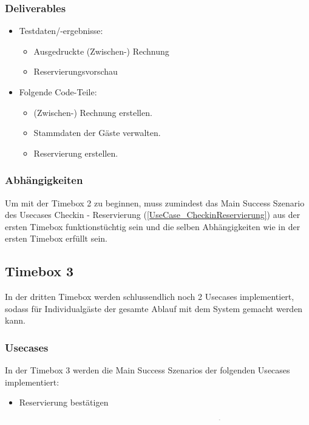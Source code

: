 \subsubsection{Deliverables}
\begin{itemize}
	\item Testdaten/-ergebnisse:
	\begin{itemize}
		\item Ausgedruckte (Zwischen-) \Gls{Rechnung}
		\item \Gls{Reservierung}svorschau
	\end{itemize}

	\item Folgende Code-Teile:
	\begin{itemize}
		\item (Zwischen-) \Gls{Rechnung} erstellen.
		\item \Gls{Stammdaten} der Gäste verwalten.
		\item \Gls{Reservierung} erstellen.
	\end{itemize}
\end{itemize}

\subsubsection{Abhängigkeiten}
Um mit der Timebox 2 zu beginnen, muss zumindest das Main Success Szenario des Usecases Checkin - Reservierung (\ref{UseCase_CheckinReservierung}) aus der ersten Timebox funktionstüchtig sein
und die selben Abhängigkeiten wie in der ersten Timebox erfüllt sein.


\subsection{Timebox 3}
In der dritten Timebox werden schlussendlich noch 2 Usecases implementiert, sodass für Individualgäste der gesamte Ablauf mit dem System gemacht werden kann.

\subsubsection{Usecases}
In der Timebox 3 werden die Main Success Szenarios der folgenden Usecases implementiert:

\begin{itemize}
	\item \Gls{Reservierung} bestätigen
	\item \Gls{Reservierung} Stornieren - Individualperson inklusive folgender Extensions:
	\begin{itemize}
		\item Der \Gls{Gast} kennt seine \Gls{Reservierungsnummer} nicht.
		\item Der \Gls{Gast} will die Reservierung zwischen 28 und 15 Tagen vor Ankunft die Reservierung stornieren.
		\item Der \Gls{Gast} will die Reservierung innerhalb von 15 Tagen vor Ankunft die Reservierung stornieren.
	\end{itemize}
\end{itemize}
